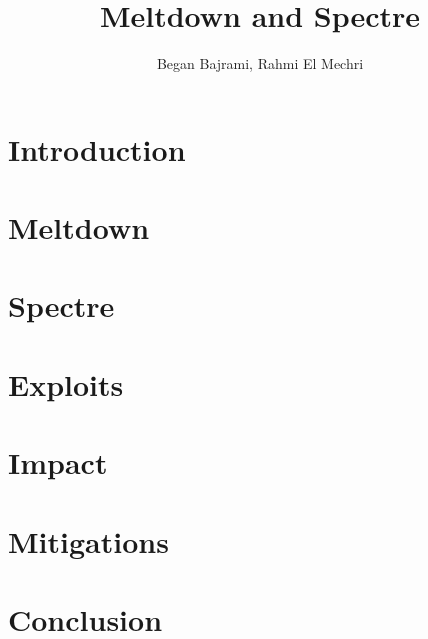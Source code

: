 \documentclass[12pt, a4paper, twocolumn]{article}
\title{Meltdown and Spectre}
\author{Began Bajrami, Rahmi El Mechri}
\begin{document}
\maketitle
\begin{abstract}

\end{abstract}
\section{Introduction}



\section{Meltdown}

\section{Spectre}

\section{Exploits}


\section{Impact}

\section{Mitigations}

\section{Conclusion}

\end{document}
